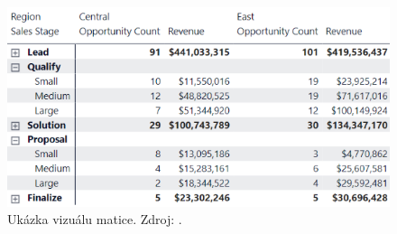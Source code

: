 \begin{figure}[hbtp!]
\begin{minipage}{.4\textwidth}
        \includegraphics[width=\textwidth]{obrazky/PBIteorie/power-bi-expansion-state.png}
        \caption{Ukázka vizuálu matice. Zdroj: \cite{bib:PBI}.}
        \label{obr:PBItab.}
    \end{minipage}
\end{figure}











